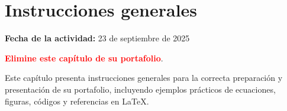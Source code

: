 \documentclass[../portafolio.tex]{subfiles}
\begin{document}
\chapter{Instrucciones generales}
\label{ch:instrucciones}


\hfill \textbf{Fecha de la actividad:} 23 de septiembre de 2025

\medskip

\textcolor{red}{\bf Elimine este capítulo de su portafolio}.

\medskip

Este capítulo presenta instrucciones generales para la correcta
preparación y presentación de su portafolio, incluyendo ejemplos
prácticos de ecuaciones, figuras, códigos y referencias en \LaTeX.
\end{document}
